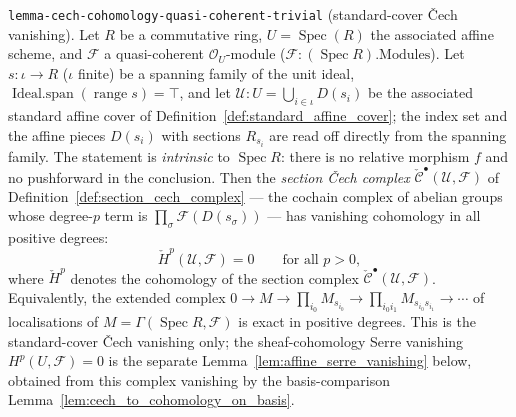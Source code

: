\begin{lemma}
{  \texttt{lemma-cech-cohomology-quasi-coherent-trivial} (standard-cover {\v C}ech
  vanishing).}
  Let \(R\) be a commutative ring, \(U = \operatorname{Spec}(R)\) the associated
  affine scheme, and \(\mathcal{F}\) a quasi-coherent \(\mathcal{O}_U\)-module
  (\(\mathcal{F} : (\operatorname{Spec} R).\mathrm{Modules}\)). Let
  \(s : \iota \to R\) (\(\iota\) finite) be a spanning family of the unit ideal,
  \(\operatorname{Ideal.span}(\operatorname{range} s) = \top\), and let
  \(\mathcal{U} : U = \bigcup_{i \in \iota} D(s_i)\) be the associated standard
  affine cover of Definition~\ref{def:standard_affine_cover}; the index set and the
  affine pieces \(D(s_i)\) with sections \(R_{s_i}\) are read off directly from the
  spanning family. The statement is \emph{intrinsic} to \(\operatorname{Spec} R\):
  there is no relative morphism \(f\) and no pushforward in the conclusion. Then the
  \emph{section {\v C}ech complex} \(\check{\mathcal{C}}^\bullet(\mathcal{U},
  \mathcal{F})\) of Definition~\ref{def:section_cech_complex} --- the cochain
  complex of abelian groups whose degree-\(p\) term is
  \(\prod_{\sigma}\mathcal{F}(D(s_\sigma))\) --- has vanishing cohomology in all
  positive degrees:
  \[
    \check{H}^p(\mathcal{U}, \mathcal{F}) = 0 \qquad \text{for all } p > 0,
  \]
  where \(\check{H}^p\) denotes the cohomology of the section complex
  \(\check{\mathcal{C}}^\bullet(\mathcal{U}, \mathcal{F})\). Equivalently, the
  extended complex
  \(0 \to M \to \prod_{i_0} M_{s_{i_0}} \to \prod_{i_0 i_1} M_{s_{i_0} s_{i_1}}
  \to \cdots\) of localisations of \(M = \Gamma(\operatorname{Spec} R, \mathcal{F})\)
  is exact in positive degrees. This is the standard-cover {\v C}ech vanishing
  only; the sheaf-cohomology Serre vanishing \(H^p(U, \mathcal{F}) = 0\) is the
  separate Lemma~\ref{lem:affine_serre_vanishing} below, obtained from this complex
  vanishing by the basis-comparison Lemma~\ref{lem:cech_to_cohomology_on_basis}.
\end{lemma}

